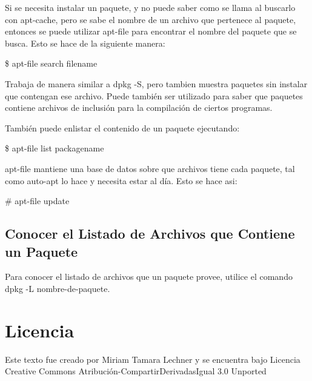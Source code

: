\documentclass[12pt]{article}
\begin{document}
Si se necesita instalar un paquete, y no puede saber como se llama al buscarlo con apt-cache, pero se sabe el nombre de un archivo que pertenece al paquete, entonces se puede utilizar apt-file para encontrar el nombre del paquete que se busca. Esto se hace de la siguiente manera:

     \$ apt-file search filename

Trabaja de manera similar a dpkg -S, pero tambien muestra paquetes sin instalar que contengan ese archivo. Puede también ser utilizado para saber que paquetes contiene archivos de inclusión para la compilación de ciertos programas.

También puede enlistar el contenido de un paquete ejecutando:

     \$ apt-file list packagename

apt-file mantiene una base de datos sobre que archivos tiene cada paquete, tal como auto-apt lo hace y necesita estar al día. Esto se hace asi:

     \# apt-file update


\subsection*{Conocer el Listado de Archivos que Contiene un Paquete}


Para conocer el listado de archivos que un paquete provee, utilice el comando dpkg -L nombre-de-paquete.





\section*{Licencia}

Este texto fue creado por Miriam Tamara Lechner y se encuentra bajo 
Licencia Creative Commons Atribución-CompartirDerivadasIgual 3.0 Unported
\end{document}
